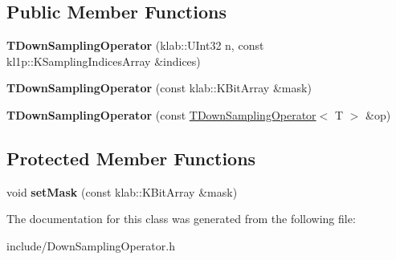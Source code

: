 \subsection*{Public Member Functions}
\begin{DoxyCompactItemize}
\item 
{\bfseries T\+Down\+Sampling\+Operator} (klab\+::\+U\+Int32 n, const kl1p\+::\+K\+Sampling\+Indices\+Array \&indices)\hypertarget{classkl1p_1_1TDownSamplingOperator_a0f0e945252682fa278a0379aea74b006}{}\label{classkl1p_1_1TDownSamplingOperator_a0f0e945252682fa278a0379aea74b006}

\item 
{\bfseries T\+Down\+Sampling\+Operator} (const klab\+::\+K\+Bit\+Array \&mask)\hypertarget{classkl1p_1_1TDownSamplingOperator_a46a2f3210bd04cadf18762bc3c5e8f8f}{}\label{classkl1p_1_1TDownSamplingOperator_a46a2f3210bd04cadf18762bc3c5e8f8f}

\item 
{\bfseries T\+Down\+Sampling\+Operator} (const \hyperlink{classkl1p_1_1TDownSamplingOperator}{T\+Down\+Sampling\+Operator}$<$ T $>$ \&op)\hypertarget{classkl1p_1_1TDownSamplingOperator_a65edea2d8799091f64ef90f4cdad455a}{}\label{classkl1p_1_1TDownSamplingOperator_a65edea2d8799091f64ef90f4cdad455a}

\end{DoxyCompactItemize}
\subsection*{Protected Member Functions}
\begin{DoxyCompactItemize}
\item 
void {\bfseries set\+Mask} (const klab\+::\+K\+Bit\+Array \&mask)\hypertarget{classkl1p_1_1TDownSamplingOperator_af4ebe3e7370c1ea995e1130edb577840}{}\label{classkl1p_1_1TDownSamplingOperator_af4ebe3e7370c1ea995e1130edb577840}

\end{DoxyCompactItemize}


The documentation for this class was generated from the following file\+:\begin{DoxyCompactItemize}
\item 
include/Down\+Sampling\+Operator.\+h\end{DoxyCompactItemize}
